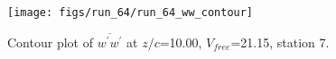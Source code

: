 \begin{figure}[H]
\centering
\texttt{[image: figs/run\_64/run\_64\_ww\_contour]}
\caption{Contour plot of $\overline{w^\prime w^\prime}$ at $z/c$=10.00, $V_{free}$=21.15, station 7.}
\end{figure}


